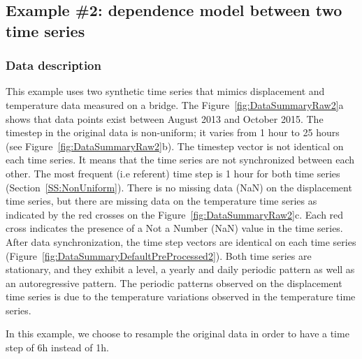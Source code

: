 \subsection{Example \#2: dependence model between two time series}
\label{S:ExampleDispTemp}

\subsubsection{Data description}

This example uses two synthetic time series that mimics displacement and temperature data measured on a bridge.
The  Figure~\ref{fig:DataSummaryRaw2}a shows that data points exist between August 2013 and October 2015.
The timestep in the original data is non-uniform; it varies from 1 hour to 25 hours (see Figure~\ref{fig:DataSummaryRaw2}b). 
The timestep vector is not identical on each time series. 
It means that the time series are not synchronized between each other.
The most frequent (i.e referent) time step is 1 hour for both time series (Section~\ref{SS:NonUniform}).
There is no missing data (NaN) on the displacement time series, but there are missing data on the temperature time series as indicated by the red crosses on the Figure~\ref{fig:DataSummaryRaw2}c.
Each red cross indicates the presence of a Not a Number (NaN) value in the time series.
After data synchronization, the time step vectors are identical on each time series (Figure~\ref{fig:DataSummaryDefaultPreProcessed2}).
Both time series are stationary, and they exhibit a level, a yearly and daily periodic pattern as well as an autoregressive pattern.
The periodic patterns observed on the displacement time series is due to the temperature variations observed in the temperature time series.

In this example, we choose to resample the original data in order to have a time step of 6h instead of 1h. 

